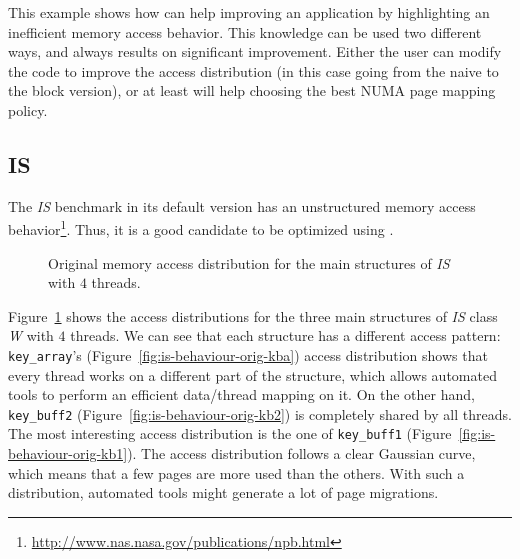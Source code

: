 This example shows
how \TABARNAC can help improving an application by highlighting an inefficient
memory access behavior. This knowledge can be used two different ways, and always
results on significant improvement. Either the user can modify the code to
improve the access distribution (in this case going from the naive to the block version),
or at least \TABARNAC will help choosing the best NUMA page mapping policy.

\subsection{IS}
\label{sec:exp-is}

The \emph{IS} benchmark in its default version has an unstructured memory access behavior\footnote{\url{http://www.nas.nasa.gov/publications/npb.html}}. Thus, it is a good candidate to be optimized using \TABARNAC.
\begin{figure}[!p]
    \centering

    \vspace{-2mm}
    \vspace{-2mm}
    \vspace{-2mm}
    \caption{Original memory access distribution for the main structures of
        \emph{IS} with $4$ threads.}
    \label{fig:is-behaviour-orig}
\end{figure}
Figure~\ref{fig:is-behaviour-orig} shows the access distributions for the
three main structures of \emph{IS} class \emph{W} with $4$ threads. We can see that
each structure has a different access pattern: \texttt{key\_array}'s
(Figure~\ref{fig:is-behaviour-orig-kba}) access distribution shows that every
thread works on a different part of the structure, which allows automated
tools to perform an efficient data/thread mapping on it. On the other hand, \texttt{key\_buff2}
(Figure~\ref{fig:is-behaviour-orig-kb2}) is completely shared by all threads.
The most interesting access distribution is the one of \texttt{key\_buff1}
(Figure~\ref{fig:is-behaviour-orig-kb1}). The access distribution follows a clear Gaussian curve, which means that a few pages are more used than the
others. With such a distribution, automated tools might generate a lot of page
migrations.

